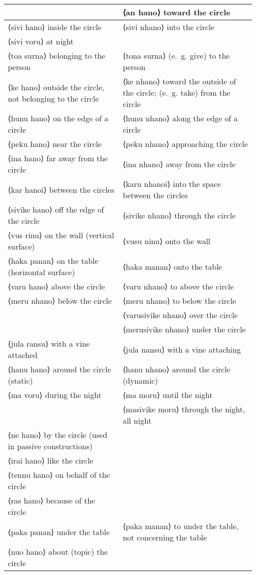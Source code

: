 \documentclass{book}
\newcommand{\ortho}[1]{⟨#1⟩}
\newcommand{\hliv}[1]{\textcolor{RubineRed}{#1}}
\begin{document}
\begin{longtabu}[c]{|X|X|}
    & \ortho{an hano} toward the circle \\
    \hline
    \ortho{sivi hano} inside the circle & \ortho{sivi nhano} into the circle \\
    \ortho{sivi voru} at night & \\
    \ortho{toa surna} belonging to the person & \ortho{\hliv{tona surna}} (e.~g. give) to the person \\
    \ortho{ke hano} outside the circle, not belonging to the circle & \ortho{ke nhano} toward the outside of the circle; (e.~g. take) from the circle \\
    \ortho{hunu hano} on the edge of a circle & \ortho{hunu nhano} along the edge of a circle \\
    \ortho{peku hano} near the circle & \ortho{peku nhano} approaching the circle \\
    \ortho{ina hano} far away from the circle & \ortho{ina nhano} away from the circle \\
    \ortho{kar hanoi} between the circles & \ortho{\hliv{karu nhanoi}} into the space between the circles \\
    \ortho{sivike hano} off the edge of the circle & \ortho{sivike nhano} through the circle \\
    \ortho{vus rinu} on the wall (vertical surface) & \ortho{\hliv{vusu ninu}} onto the wall \\
    \ortho{haka panan} on the table (horizontal surface) & \ortho{haka manan} onto the table \\
    \ortho{varu hano} above the circle & \ortho{varu nhano} to above the circle \\
    \ortho{meru nhano} below the circle & \ortho{meru nhano} to below the circle \\
    & \ortho{varusivike nhano} over the circle \\
    & \ortho{merusivike nhano} under the circle \\
    \ortho{jula ransu} with a vine attached & \ortho{jula nansu} with a vine attaching \\
    \ortho{hanu hano} around the circle (static) & \ortho{hanu nhano} around the circle (dynamic) \\
    \ortho{ma voru} during the night & \ortho{ma moru} until the night \\
    & \ortho{masivike moru} through the night, all night \\
    \ortho{ne hano} by the circle (used in passive constructions) & \\
    \ortho{irai hano} like the circle & \\
    \ortho{tennu hano} on behalf of the circle & \\
    \ortho{ras hano} because of the circle & \\
    \ortho{paka panan} under the table & \ortho{paka manan} to under the table, not concerning the table \\
    \ortho{nuo hano} about (topic) the circle & \\
\end{longtabu}
\end{document}
